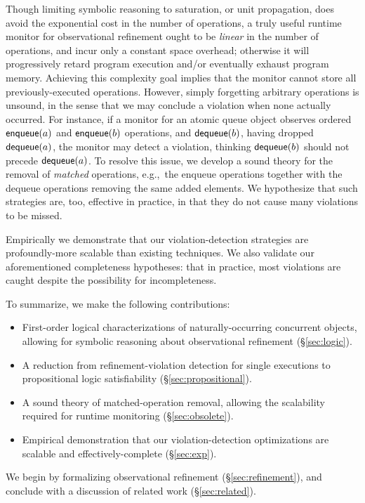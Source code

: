 Though limiting symbolic reasoning to saturation, or unit propagation, does
avoid the exponential cost in the number of operations, a truly useful runtime
monitor for observational refinement ought to be \emph{linear} in the number of
operations, and incur only a constant space overhead; otherwise it will
progressively retard program execution and/or eventually exhaust program
memory. Achieving this complexity goal implies that the monitor cannot store
all previously-executed operations. However, simply forgetting arbitrary
operations is unsound, in the sense that we may conclude a violation when none
actually occurred. For instance, if a monitor for an atomic queue object
observes ordered ${\sf enqueue}(a)$ and ${\sf enqueue}(b)$ operations, and
${\sf dequeue}(b)$, having dropped ${\sf dequeue}(a)$, the monitor may detect a
violation, thinking ${\sf dequeue}(b)$ should not precede ${\sf dequeue}(a)$.
To resolve this issue, we develop a sound theory for the removal of
\emph{matched} operations, e.g.,~the {\sf enqueue} operations together with the
{\sf dequeue} operations removing the same added elements. We hypothesize that
such strategies are, too, effective in practice, in that they do not cause many
violations to be missed.

Empirically we demonstrate that our violation-detection strategies are
profoundly-more scalable than existing techniques. We also validate our
aforementioned completeness hypotheses: that in practice, most violations are
caught despite the possibility for incompleteness.

To summarize, we make the following contributions:
\begin{itemize}

  \item First-order logical characterizations of naturally-occurring concurrent
  objects, allowing for symbolic reasoning about observational refinement
  (\S\ref{sec:logic}).

  \item A reduction from refinement-violation detection for single executions
  to propositional logic satisfiability (\S\ref{sec:propositional}).
  
  \item A sound theory of matched-operation removal, allowing the scalability
  required for runtime monitoring (\S\ref{sec:obsolete}).
  
  \item Empirical demonstration that our violation-detection optimizations are
  scalable and effectively-complete (\S\ref{sec:exp}).

\end{itemize}
We begin by formalizing observational refinement (\S\ref{sec:refinement}), and
conclude with a discussion of related work (\S\ref{sec:related}).
